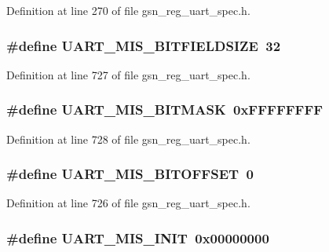 Definition at line 270 of file gsn\_\-reg\_\-uart\_\-spec.h.

\hypertarget{a00575_aa222440139eb174738c8e8db38defea6}{
\subsubsection[{UART\_\-MIS\_\-BITFIELDSIZE}]{\setlength{\rightskip}{0pt plus 5cm}\#define UART\_\-MIS\_\-BITFIELDSIZE~32}}
\label{a00575_aa222440139eb174738c8e8db38defea6}


Definition at line 727 of file gsn\_\-reg\_\-uart\_\-spec.h.

\hypertarget{a00575_ae59797bd011d4ecf8f938bc14643f8eb}{
\subsubsection[{UART\_\-MIS\_\-BITMASK}]{\setlength{\rightskip}{0pt plus 5cm}\#define UART\_\-MIS\_\-BITMASK~0xFFFFFFFF}}
\label{a00575_ae59797bd011d4ecf8f938bc14643f8eb}


Definition at line 728 of file gsn\_\-reg\_\-uart\_\-spec.h.

\hypertarget{a00575_a87021cfe2ace821928fc6ecaf431a55d}{
\subsubsection[{UART\_\-MIS\_\-BITOFFSET}]{\setlength{\rightskip}{0pt plus 5cm}\#define UART\_\-MIS\_\-BITOFFSET~0}}
\label{a00575_a87021cfe2ace821928fc6ecaf431a55d}


Definition at line 726 of file gsn\_\-reg\_\-uart\_\-spec.h.

\hypertarget{a00575_aa8eebc2ba4a7f92119466ac11543b6ad}{
\subsubsection[{UART\_\-MIS\_\-INIT}]{\setlength{\rightskip}{0pt plus 5cm}\#define UART\_\-MIS\_\-INIT~0x00000000}}
\label{a00575_aa8eebc2ba4a7f92119466ac11543b6ad}


